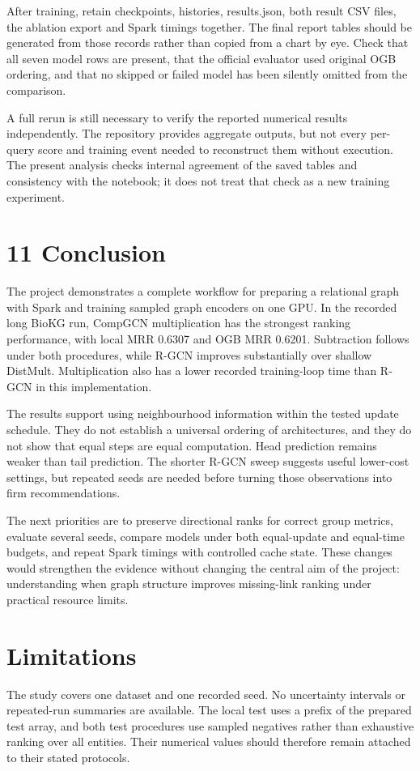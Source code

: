 \documentclass[11pt]{article}
\begin{document}
After training, retain checkpoints, histories, results.json, both result CSV files, the ablation export and Spark timings together. The final report tables should be generated from those records rather than copied from a chart by eye. Check that all seven model rows are present, that the official evaluator used original OGB ordering, and that no skipped or failed model has been silently omitted from the comparison.

A full rerun is still necessary to verify the reported numerical results independently. The repository provides aggregate outputs, but not every per-query score and training event needed to reconstruct them without execution. The present analysis checks internal agreement of the saved tables and consistency with the notebook; it does not treat that check as a new training experiment.

\section*{11 Conclusion}
The project demonstrates a complete workflow for preparing a relational graph with Spark and training sampled graph encoders on one GPU. In the recorded long BioKG run, CompGCN multiplication has the strongest ranking performance, with local MRR 0.6307 and OGB MRR 0.6201. Subtraction follows under both procedures, while R-GCN improves substantially over shallow DistMult. Multiplication also has a lower recorded training-loop time than R-GCN in this implementation.

The results support using neighbourhood information within the tested update schedule. They do not establish a universal ordering of architectures, and they do not show that equal steps are equal computation. Head prediction remains weaker than tail prediction. The shorter R-GCN sweep suggests useful lower-cost settings, but repeated seeds are needed before turning those observations into firm recommendations.

The next priorities are to preserve directional ranks for correct group metrics, evaluate several seeds, compare models under both equal-update and equal-time budgets, and repeat Spark timings with controlled cache state. These changes would strengthen the evidence without changing the central aim of the project: understanding when graph structure improves missing-link ranking under practical resource limits.

\section*{Limitations}
The study covers one dataset and one recorded seed. No uncertainty intervals or repeated-run summaries are available. The local test uses a prefix of the prepared test array, and both test procedures use sampled negatives rather than exhaustive ranking over all entities. Their numerical values should therefore remain attached to their stated protocols.
\end{document}
